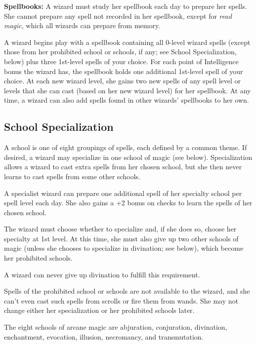 \textbf{Spellbooks:} A wizard must study her spellbook each day to prepare her 
spells. She cannot prepare any spell not recorded in her spellbook, except for 
\textit{read magic}, which all wizards can prepare from memory.

A wizard begins play with a spellbook containing all 0-level wizard spells (except 
those from her prohibited school or schools, if any; see School Specialization, 
below) plus three 1st-level spells of your choice. For each point of Intelligence 
bonus the wizard has, the spellbook holds one additional 1st-level spell of your 
choice. At each new wizard level, she gains two new spells of any spell level or 
levels that she can cast (based on her new wizard level) for her spellbook. At 
any time, a wizard can also add spells found in other wizards' spellbooks to her 
own.

\subsection{School Specialization}

A school is one of eight groupings of spells, each defined by a common theme. If 
desired, a wizard may specialize in one school of magic (see below). Specialization 
allows a wizard to cast extra spells from her chosen school, but she then never 
learns to cast spells from some other schools.

A specialist wizard can prepare one additional spell of her specialty school per 
spell level each day. She also gains a +2 bonus on  checks to learn the 
spells of her chosen school.

The wizard must choose whether to specialize and, if she does so, choose her specialty 
at 1st level. At this time, she must also give up two other schools of magic (unless 
she chooses to specialize in divination; see below), which become her prohibited 
schools.

A wizard can never give up divination to fulfill this requirement.

Spells of the prohibited school or schools are not available to the wizard, and 
she can't even cast such spells from scrolls or fire them from wands. She may not 
change either her specialization or her prohibited schools later.

The eight schools of arcane magic are abjuration, conjuration, divination, enchantment, 
evocation, illusion, necromancy, and transmutation.

